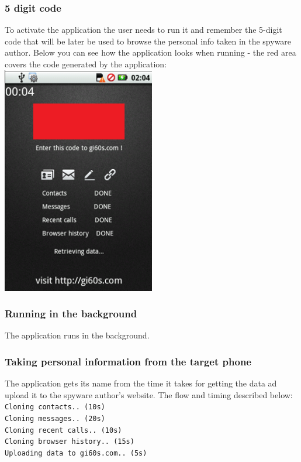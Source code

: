 \subsubsection{5 digit code}
\parbox{\textwidth}{
To activate the application the user needs to run it and remember the 5-digit code that will be later be used to browse the personal info taken in the spyware author. Below you can see how the application looks when running - the red area covers the code generated by the application: \\
\includegraphics[width=0.5\textwidth]{figs/gone60_5.png}
}

\subsubsection{Running in the background}
The application runs in the background.

\subsubsection{Taking personal information from the target phone}
\parbox{\textwidth}{
The application gets its name from the time it takes for getting the data ad upload it to the spyware author's website. The flow and timing described below: \\
\texttt{Cloning contacts.. (10s)} \\
\texttt{Cloning messages.. (20s)} \\
\texttt{Cloning recent calls.. (10s)} \\
\texttt{Cloning browser history.. (15s)} \\
\texttt{Uploading data to gi60s.com.. (5s)} \\
}

